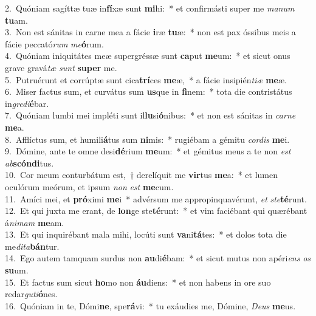 {2.~}Quóniam sagíttæ tuæ in\textbf{fí}xæ sunt \textbf{mi}hi:~* et confirmásti super me \textit{ma}\textit{num} \textbf{tu}am.\\
{3.~}Non est sánitas in carne mea a fácie \textbf{i}ræ \textbf{tu}æ:~* non est pax óssibus meis a fácie peccató\textit{rum} \textit{me}\textbf{ó}rum.\\
{4.~}Quóniam iniquitátes meæ supergréssæ sunt \textbf{ca}put \textbf{me}um:~* et sicut onus grave gravá\textit{tæ} \textit{sunt} \textbf{su}\textbf{per} me.\\
{5.~}Putruérunt et corrúptæ sunt cica\textbf{trí}ces \textbf{me}æ,~* a fácie insipién\textit{ti}\textit{æ} \textbf{me}æ.\\
{6.~}Miser factus sum, et curvátus sum \textbf{us}que in \textbf{fi}nem:~* tota die contristátus in\textit{gre}\textit{di}\textbf{é}bar.\\
{7.~}Quóniam lumbi mei impléti sunt il\textbf{lu}si\textbf{ó}nibus:~* et non est sánitas in \textit{car}\textit{ne} \textbf{me}a.\\
{8.~}Afflíctus sum, et humili\textbf{á}tus sum \textbf{ni}mis:~* rugiébam a gémitu \textit{cor}\textit{dis} \textbf{me}i.\\
{9.~}Dómine, ante te omne desi\textbf{dé}rium \textbf{me}um:~* et gémitus meus a te non \textit{est} \textit{ab}\textbf{scón}\textbf{di}tus.\\
{10.~}Cor meum conturbátum est,~† derelíquit me \textbf{vir}tus \textbf{me}a:~* et lumen oculórum meórum, et ipsum \textit{non} \textit{est} \textbf{me}cum.\\
{11.~}Amíci mei, et \textbf{pró}ximi \textbf{me}i~* advérsum me appropinquavérunt, \textit{et} \textit{ste}\textbf{té}runt.\\
{12.~}Et qui juxta me erant, de \textbf{lon}ge ste\textbf{té}runt:~* et vim faciébant qui quærébant á\textit{ni}\textit{mam} \textbf{me}am.\\
{13.~}Et qui inquirébant mala mihi, locúti sunt \textbf{va}ni\textbf{tá}tes:~* et dolos tota die me\textit{di}\textit{ta}\textbf{bán}tur.\\
{14.~}Ego autem tamquam surdus non \textbf{au}di\textbf{é}bam:~* et sicut mutus non apéri\textit{ens} \textit{os} \textbf{su}um.\\
{15.~}Et factus sum sicut \textbf{ho}mo non \textbf{áu}diens:~* et non habens in ore suo redar\textit{gu}\textit{ti}\textbf{ó}nes.\\
{16.~}Quóniam in te, Dómi\textbf{ne}, spe\textbf{rá}vi:~* tu exáudies me, Dómine, \textit{De}\textit{us} \textbf{me}us.\\
